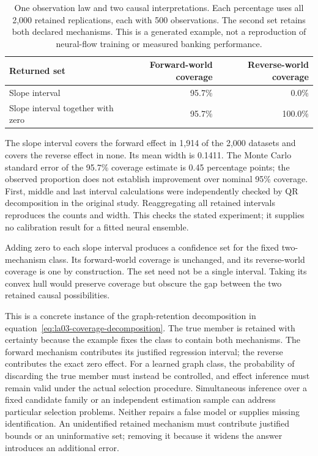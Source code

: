\begin{table}[htbp]
\centering\small
\begin{tabular}{lrr}
\toprule
Returned set & Forward-world coverage & Reverse-world coverage\\
\midrule
Slope interval & 95.7\% & 0.0\%\\
Slope interval together with zero & 95.7\% & 100.0\%\\
\bottomrule
\end{tabular}
\caption{One observation law and two causal interpretations. Each percentage
uses all 2,000 retained replications, each with 500 observations. The second
set retains both declared mechanisms. This is a generated example, not a
reproduction of neural-flow training or measured banking performance.}
\label{rel69:graph-coverage}
\end{table}

The slope interval covers the forward effect in 1,914 of the 2,000 datasets
and covers the reverse effect in none. Its mean width is 0.1411. The Monte
Carlo standard error of the 95.7\% coverage estimate is 0.45 percentage points;
the observed proportion does not establish improvement over nominal 95\%
coverage. First, middle and last interval calculations were independently
checked by QR decomposition in the original study. Reaggregating all retained
intervals reproduces the counts and width. This checks the stated experiment;
it supplies no calibration result for a fitted neural ensemble.

Adding zero to each slope interval produces a confidence set for the fixed
two-mechanism class. Its forward-world coverage is unchanged, and its
reverse-world coverage is one by construction. The set need not be a single
interval. Taking its convex hull would preserve coverage but obscure the
gap between the two retained causal possibilities.

This is a concrete instance of the graph-retention decomposition in
equation~\eqref{eq:la03-coverage-decomposition}. The true member is retained
with certainty because the example fixes the class to contain both mechanisms.
The forward mechanism contributes its justified regression interval; the
reverse contributes the exact zero effect. For a learned graph class, the
probability of discarding the true member must instead be controlled, and
effect inference must remain valid under the actual selection procedure.
Simultaneous inference over a fixed candidate family or an independent
estimation sample can address particular selection problems. Neither repairs
a false model or supplies missing identification. An unidentified retained
mechanism must contribute justified bounds or an uninformative set; removing
it because it widens the answer introduces an additional error.

